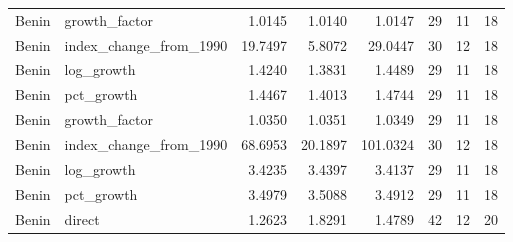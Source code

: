 \begin{table}
\begin{tabular}[t]{llrrrrrr}
Benin & growth\_factor & 1.0145 & 1.0140 & 1.0147 & 29 & 11 & 18\\
\addlinespace
Benin & index\_change\_from\_1990 & 19.7497 & 5.8072 & 29.0447 & 30 & 12 & 18\\
Benin & log\_growth & 1.4240 & 1.3831 & 1.4489 & 29 & 11 & 18\\
Benin & pct\_growth & 1.4467 & 1.4013 & 1.4744 & 29 & 11 & 18\\
Benin & growth\_factor & 1.0350 & 1.0351 & 1.0349 & 29 & 11 & 18\\
Benin & index\_change\_from\_1990 & 68.6953 & 20.1897 & 101.0324 & 30 & 12 & 18\\
\addlinespace
Benin & log\_growth & 3.4235 & 3.4397 & 3.4137 & 29 & 11 & 18\\
Benin & pct\_growth & 3.4979 & 3.5088 & 3.4912 & 29 & 11 & 18\\
Benin & direct & 1.2623 & 1.8291 & 1.4789 & 42 & 12 & 20\\
\bottomrule
\end{tabular}
\end{table}